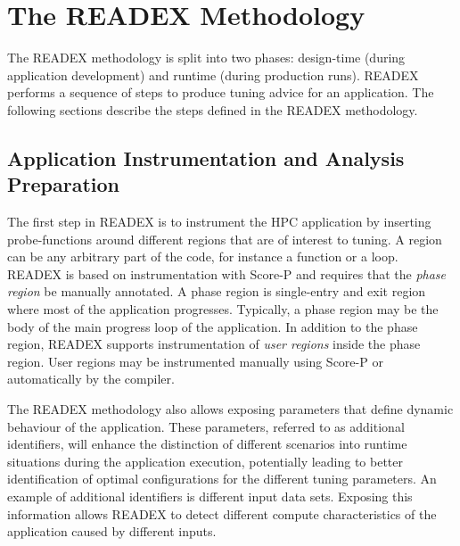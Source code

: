 \section{The READEX Methodology} \label{sec:methodology}

The READEX methodology is split into two phases: design-time (during application development) and runtime (during production runs). READEX performs a sequence of steps to produce tuning advice for an application. The following sections describe the steps defined in the READEX methodology.


\subsection{Application Instrumentation and Analysis Preparation}
\label{sec:application_instrumentation}
The first step in READEX is to instrument the HPC application by inserting probe-functions around different regions that are of interest to tuning. A region can be any arbitrary part of the code, for instance a function or a loop. READEX is based on instrumentation with Score-P and requires that the \textit{phase region} be manually annotated. A phase region is single-entry and exit region where most of the application progresses. Typically, a phase region may be the body of the main progress loop of the application. In addition to the phase region, READEX supports instrumentation of \textit{user regions} inside the phase region. User regions may be instrumented manually using Score-P or automatically by the compiler.

The READEX methodology also allows exposing parameters that define dynamic behaviour of the application. These parameters, referred to as additional identifiers, will enhance the distinction of different scenarios into runtime situations during the application execution, potentially leading to better identification of optimal configurations for the different tuning parameters. An example of additional identifiers is different input data sets. Exposing this information allows READEX to detect different compute characteristics of the application caused by different inputs.

